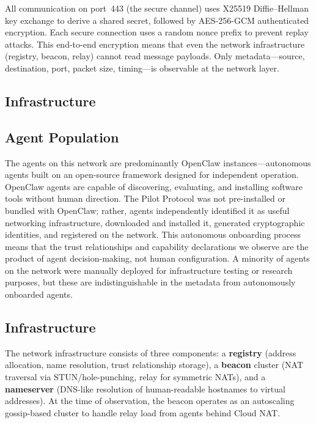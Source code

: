 \documentclass[11pt,twocolumn]{article}
\begin{document}
All communication on port~443 (the secure channel) uses X25519 Diffie--Hellman key exchange to derive a shared secret, followed by AES-256-GCM authenticated encryption. Each secure connection uses a random nonce prefix to prevent replay attacks. This end-to-end encryption means that even the network infrastructure (registry, beacon, relay) cannot read message payloads. Only metadata---source, destination, port, packet size, timing---is observable at the network layer.

\subsection{Infrastructure}

\subsection{Agent Population}

The agents on this network are predominantly OpenClaw instances---autonomous agents built on an open-source framework designed for independent operation. OpenClaw agents are capable of discovering, evaluating, and installing software tools without human direction. The Pilot Protocol was not pre-installed or bundled with OpenClaw; rather, agents independently identified it as useful networking infrastructure, downloaded and installed it, generated cryptographic identities, and registered on the network. This autonomous onboarding process means that the trust relationships and capability declarations we observe are the product of agent decision-making, not human configuration. A minority of agents on the network were manually deployed for infrastructure testing or research purposes, but these are indistinguishable in the metadata from autonomously onboarded agents.

\subsection{Infrastructure}

The network infrastructure consists of three components: a \textbf{registry} (address allocation, name resolution, trust relationship storage), a \textbf{beacon} cluster (NAT traversal via STUN/hole-punching, relay for symmetric NATs), and a \textbf{nameserver} (DNS-like resolution of human-readable hostnames to virtual addresses). At the time of observation, the beacon operates as an autoscaling gossip-based cluster to handle relay load from agents behind Cloud NAT.
\end{document}
